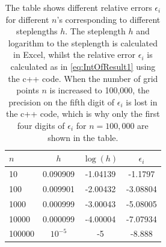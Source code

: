 \begin{table}[H]
	\centering
  \begin{tabular}{| l | c | c | c |}
    \hline
    $n$		& $h$ 	& $\log(h)$ & $\epsilon_i$ \\ \hline
    10 		& 0.090909 	& -1.04139 & -1.1797 
    \\ \hline
    100 	& 0.009901 	& -2.00432 & -3.08804 
    \\ \hline
    1000 	& 0.000999 	& -3.00043 & -5.08005 
    \\ \hline
	10000 	& 0.000099 	& -4.00004 & -7.07934 
    \\ \hline
    100000 	& $10^{-5}$	& -5	   & -8.888 
    \\ \hline
  \end{tabular}
  \caption{The table shows different relative errors $\epsilon_i$ for different $n$'s corresponding to different steplengths $h$. The steplength $h$ and logarithm to the steplength is calculated in Excel, whilst the relative error $\epsilon_i$ is calculated as in \eqref{eq:IntOfResult1} using the c++ code. When the number of grid points $n$ is increased to 100,000, the precision on the fifth digit of $\epsilon_i$ is lost in the c++ code, which is why only the first four digits of $\epsilon_i$ for $n = 100,000$ are shown in the table.}
  \label{tab:IntOfResult1}
\end{table}

